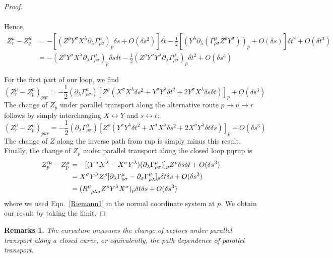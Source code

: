 \documentclass[a4paper]{article}
\newtheorem{remarks}{Remarks}[section]
\theoremstyle{new}
\begin{document}
\begin{proof}
\begin{enumerate}
\begin{align}
    \end{align}
    Hence, 
    \begin{align}
    Z_r^\mu-Z_q^\mu&=-[(Z^\rho Y^\sigma X^\lambda\partial_\lambda\Gamma_{\rho\sigma}^\mu)_p\delta s+O(\delta s^2)]\delta t-\frac{1}{2}[(Y^\lambda\partial_\lambda(\Gamma^\mu_{\rho\sigma}Z^\rho Y^\sigma))_p+O(\delta s)]\delta t^2+O(\delta t^3)\nonumber\\&=-(Z^\rho Y^\sigma X^\lambda\partial_\lambda\Gamma^\mu_{\rho\sigma})_p\delta s\delta t-\frac{1}{2}(Z^\rho Y^\sigma Y^\lambda\partial_\lambda\Gamma^\mu_{\rho\sigma})_p\delta t^2+O(\delta s^3)\nonumber
    \end{align}
\end{enumerate}
For the first part of our loop, we find
$$(Z_r^\mu-Z_p^\mu)_{pqr}=-\frac{1}{2}(\partial_\lambda\Gamma^\mu_{\rho\sigma})[Z^\rho(X^\sigma X^\lambda\delta s^2+Y^\sigma Y^\lambda\delta t^2+2Y^\sigma X^\lambda\delta s\delta t)]_p+O(\delta s^3)$$
The change of $Z_p$ under parallel transport along the alternative route $p\rightarrow u\rightarrow r$ follows by simply interchanging $X\leftrightarrow Y$ and $s\leftrightarrow t$:
$$(Z_r^\mu-Z_p^\mu)_{pur}=-\frac{1}{2}(\partial_\lambda\Gamma^\mu_{\rho\sigma})[Z^\rho(Y^\sigma Y^\lambda\delta t^2+X^\sigma X^\lambda\delta s^2+2X^\sigma Y^\lambda\delta t\delta s)]_p+O(\delta s^3)$$
The change of $Z$ along the inverse path from rup is simply minus this result. Finally, the change of $Z_p$ under parallel transport along the closed loop pqrup is
\begin{align}
    Z_p'^\mu-Z_p^\mu&=-[(Y^\sigma X^\lambda-X^\sigma Y^\lambda)(\partial_\lambda\Gamma^\mu_{\rho\sigma})]_pZ^\rho\delta s\delta t+O(\delta s^3)\nonumber\\&=X^\sigma Y^\lambda Z^\rho[\partial_\lambda\Gamma^\mu_{\rho\sigma}-\partial_\sigma\Gamma_{\rho\lambda}^\mu]_p\delta t\delta s+O(\delta s^3)\nonumber\\&=(\tensor*{R}{*_{}^{\mu}_{\rho\lambda\sigma}}Z^\rho Y^\lambda X^\sigma)_p\delta t\delta s+O(\delta s^3)\nonumber
\end{align}
where we used Eqn.~\ref{Riemann1} in the normal coordinate system at $p$. We obtain our result by taking the limit.
\end{proof}
\begin{remarks}
The curvature measures the change of vectors under parallel transport along a closed curve, or equivalently, the path dependence of parallel transport.
\end{remarks}
\end{document}
